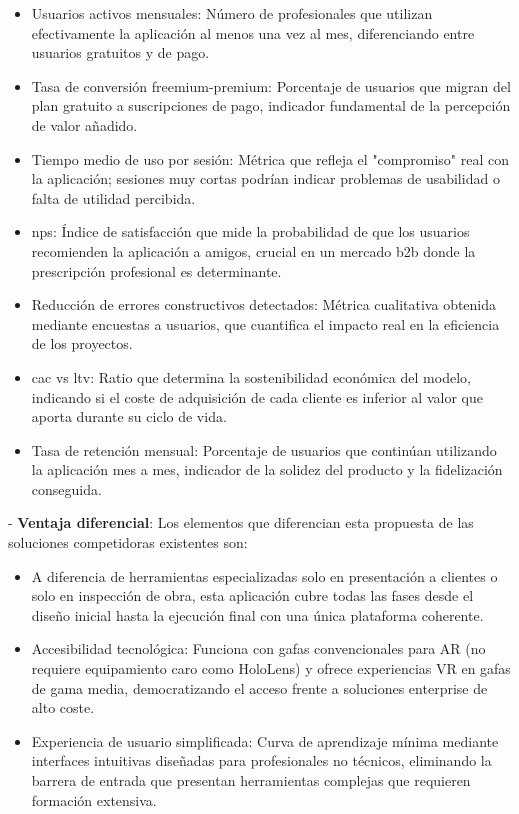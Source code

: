 \begin{itemize}
\item Usuarios activos mensuales: Número de profesionales que utilizan efectivamente la aplicación al menos una vez al mes, diferenciando entre usuarios gratuitos y de pago.
\item Tasa de conversión freemium-premium: Porcentaje de usuarios que migran del plan gratuito a suscripciones de pago, indicador fundamental de la percepción de valor añadido.
\item Tiempo medio de uso por sesión: Métrica que refleja el "compromiso" real con la aplicación; sesiones muy cortas podrían indicar problemas de usabilidad o falta de utilidad percibida.
\item \gls{nps}: Índice de satisfacción que mide la probabilidad de que los usuarios recomienden la aplicación a amigos, crucial en un mercado \gls{b2b} donde la prescripción profesional es determinante.
\item Reducción de errores constructivos detectados: Métrica cualitativa obtenida mediante encuestas a usuarios, que cuantifica el impacto real en la eficiencia de los proyectos.
\item \gls{cac} vs \gls{ltv}: Ratio que determina la sostenibilidad económica del modelo, indicando si el coste de adquisición de cada cliente es inferior al valor que aporta durante su ciclo de vida.
\item Tasa de retención mensual: Porcentaje de usuarios que continúan utilizando la aplicación mes a mes, indicador de la solidez del producto y la fidelización conseguida.
\end{itemize}
- \textbf{Ventaja diferencial}: Los elementos que diferencian esta propuesta de las soluciones competidoras existentes son:
\begin{itemize}
\item A diferencia de herramientas especializadas solo en presentación a clientes o solo en inspección de obra, esta aplicación cubre todas las fases desde el diseño inicial hasta la ejecución final con una única plataforma coherente.
\item Accesibilidad tecnológica: Funciona con gafas convencionales para AR (no requiere equipamiento caro como HoloLens) y ofrece experiencias VR en gafas de gama media, democratizando el acceso frente a soluciones enterprise de alto coste.
\item Experiencia de usuario simplificada: Curva de aprendizaje mínima mediante interfaces intuitivas diseñadas para profesionales no técnicos, eliminando la barrera de entrada que presentan herramientas complejas que requieren formación extensiva.
\end{itemize}

